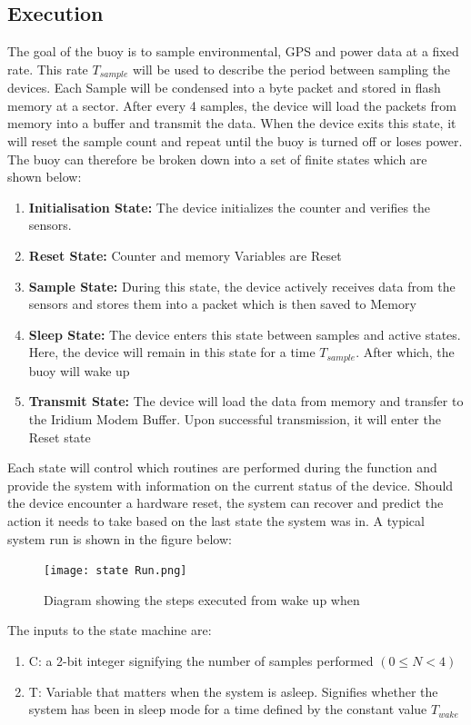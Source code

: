 \subsection{Execution}

The goal of the buoy is to sample environmental, GPS and power data at a fixed rate. This rate $T_{sample}$ will be used to describe the period between sampling the devices. Each Sample will be condensed into a byte packet and stored in flash memory at a sector. After every 4 samples, the device will load the packets from memory into a buffer and transmit the data. When the device exits this state, it will reset the sample count and repeat until the buoy is turned off or loses power. The buoy can therefore be broken down into a set of finite states which are shown below:

\begin{enumerate}
	\item \textbf{Initialisation State:} The device initializes the counter and verifies the sensors.
	\item \textbf{Reset State:} Counter and memory Variables are Reset
	\item \textbf{Sample State:} During this state, the device actively receives data from the sensors and stores them into a packet which is then saved to Memory
	\item \textbf{Sleep State:} The device enters this state between samples and active states. Here, the device will remain in this state for a time $T_{sample}$. After which, the buoy will wake up 
	\item \textbf{Transmit State:} The device will load the data from memory and transfer to the Iridium Modem Buffer. Upon successful transmission, it will enter the Reset state
\end{enumerate}

Each state will control which routines are performed during the function and provide the system with information on the current status of the device. Should the device encounter a hardware reset, the system can recover and predict the action it needs to take based on the last state the system was in. A typical system run is shown in the figure below:

\begin{figure}[H]
	\centering
	\texttt{[image: state Run.png]}
	\caption{Diagram showing the steps executed from wake up when }
	\label{fig:state_run}
\end{figure}

The inputs to the state machine are:
\begin{enumerate}
	\item C: a 2-bit integer signifying the number of samples performed $(0 \leq N <4)$
	\item T: Variable that matters when the system is asleep. Signifies whether the system has been in sleep mode for a time defined by the constant value $T_{wake}$
\end{enumerate}

